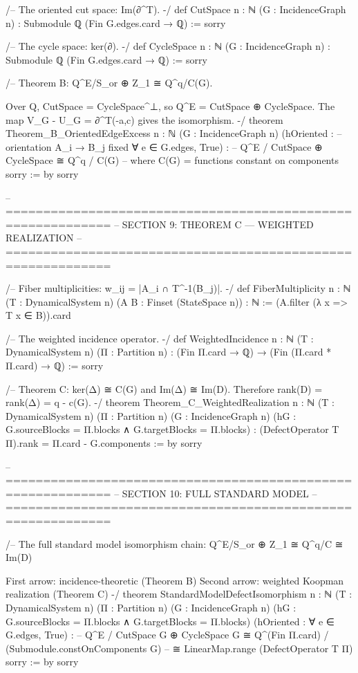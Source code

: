 /-- The oriented cut space: Im(∂^T). -/
def CutSpace {n : ℕ} (G : IncidenceGraph n) : Submodule ℚ (Fin G.edges.card → ℚ) :=
  sorry

/-- The cycle space: ker(∂). -/
def CycleSpace {n : ℕ} (G : IncidenceGraph n) : Submodule ℚ (Fin G.edges.card → ℚ) :=
  sorry

/-- Theorem B: Q^E/S_or ⊕ Z_1 ≅ Q^q/C(G).
    
    Over Q, CutSpace = CycleSpace^⊥, so Q^E = CutSpace ⊕ CycleSpace.
    The map V_G - U_G = ∂^T(-a,c) gives the isomorphism.
-/
theorem Theorem_B_OrientedEdgeExcess {n : ℕ} (G : IncidenceGraph n)
    (hOriented : -- orientation A_i → B_j fixed
      ∀ e ∈ G.edges, True) :
    -- Q^E / CutSpace ⊕ CycleSpace ≅ Q^q / C(G)
    -- where C(G) = functions constant on components
    sorry := by
  sorry

-- ============================================================
-- SECTION 9: THEOREM C — WEIGHTED REALIZATION
-- ============================================================

/-- Fiber multiplicities: w_{ij} = |A_i ∩ T^{-1}(B_j)|. -/
def FiberMultiplicity {n : ℕ} (T : DynamicalSystem n) (A B : Finset (StateSpace n)) : ℕ :=
  (A.filter (λ x => T x ∈ B)).card

/-- The weighted incidence operator. -/
def WeightedIncidence {n : ℕ} (T : DynamicalSystem n) (Π : Partition n) :
    (Fin Π.card → ℚ) → (Fin (Π.card * Π.card) → ℚ) :=
  sorry

/-- Theorem C: ker(Δ) ≅ C(G) and Im(Δ) ≅ Im(D).
    Therefore rank(D) = rank(Δ) = q - c(G). -/
theorem Theorem_C_WeightedRealization {n : ℕ} (T : DynamicalSystem n) (Π : Partition n)
    (G : IncidenceGraph n) (hG : G.sourceBlocks = Π.blocks ∧ G.targetBlocks = Π.blocks) :
    (DefectOperator T Π).rank = Π.card - G.components := by
  sorry

-- ============================================================
-- SECTION 10: FULL STANDARD MODEL
-- ============================================================

/-- The full standard model isomorphism chain:
    Q^E/S_or ⊕ Z_1 ≅ Q^q/C ≅ Im(D)
    
    First arrow: incidence-theoretic (Theorem B)
    Second arrow: weighted Koopman realization (Theorem C)
-/
theorem StandardModelDefectIsomorphism {n : ℕ} (T : DynamicalSystem n) (Π : Partition n)
    (G : IncidenceGraph n) (hG : G.sourceBlocks = Π.blocks ∧ G.targetBlocks = Π.blocks)
    (hOriented : ∀ e ∈ G.edges, True) :
    -- Q^E / CutSpace G ⊕ CycleSpace G ≅ Q^(Fin Π.card) / (Submodule.constOnComponents G)
    -- ≅ LinearMap.range (DefectOperator T Π)
    sorry := by
  sorry

